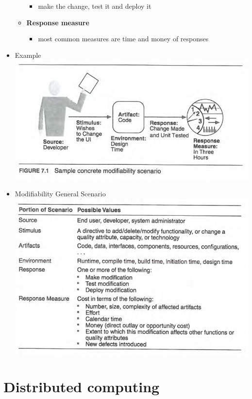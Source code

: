 \documentclass[11pt]{article}
\makeatletter
\def\maxwidth{\ifdim\Gin@nat@width>\linewidth\linewidth
    \else\Gin@nat@width\fi}
\let\Oldincludegraphics\includegraphics
\renewcommand{\includegraphics}[1]{\Oldincludegraphics[width=.8\maxwidth]{#1}}
\providecommand{\tightlist}{%
      \setlength{\itemsep}{0pt}\setlength{\parskip}{0pt}}
\makeatother
\begin{document}
\begin{itemize}
\begin{itemize}
    \begin{itemize}
    \tightlist
    \item
      make the change, test it and deploy it
    \end{itemize}
  \item
    \textbf{Response measure}

    \begin{itemize}
    \tightlist
    \item
      most common measures are time and money of responses
    \end{itemize}
  \end{itemize}
\item
  Example \includegraphics{img/modification_example.png}
\item
  Modifiability General Scenario
  \includegraphics{img/modification_general.png}
\end{itemize}

    \hypertarget{distributed-computing}{%
\section{Distributed computing}\label{distributed-computing}}
\end{document}

